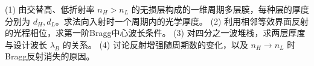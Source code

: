 (1) 由交替高、低折射率 \(n_H>n_L\) 的无损层构成的一维周期多层膜，每种层的厚度分别为 \(d_H,d_L\)。求法向入射时一个周期内的光学厚度。
(2) 利用相邻等效界面反射的光程相位，求第一阶Bragg中心波长条件。
(3) 对四分之一波堆栈，求两层厚度与设计波长 \(\lambda_B\) 的关系。
(4) 讨论反射增强随周期数的变化，以及 \(n_H\to n_L\) 时Bragg反射消失的原因。
